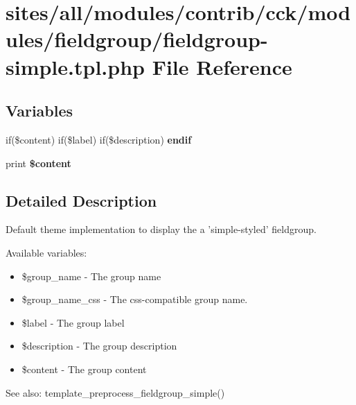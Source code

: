 \hypertarget{fieldgroup-simple_8tpl_8php}{
\section{sites/all/modules/contrib/cck/modules/fieldgroup/fieldgroup-simple.tpl.php File Reference}
\label{fieldgroup-simple_8tpl_8php}
}
\subsection*{Variables}
\begin{CompactItemize}
\item 
\hypertarget{fieldgroup-simple_8tpl_8php_82cd33ca97ff99f2fcc5e9c81d65251b}{
if(\$content) if(\$label) if(\$description) \textbf{endif}}
\label{fieldgroup-simple_8tpl_8php_82cd33ca97ff99f2fcc5e9c81d65251b}

\item 
\hypertarget{fieldgroup-simple_8tpl_8php_b7b7210f43aa78e34f0b202de894a74c}{
print \textbf{\$content}}
\label{fieldgroup-simple_8tpl_8php_b7b7210f43aa78e34f0b202de894a74c}

\end{CompactItemize}


\subsection{Detailed Description}
Default theme implementation to display the a 'simple-styled' fieldgroup.

Available variables:\begin{itemize}
\item \$group\_\-name - The group name\item \$group\_\-name\_\-css - The css-compatible group name.\item \$label - The group label\item \$description - The group description\item \$content - The group content\end{itemize}


\begin{Desc}
\item[See also:]template\_\-preprocess\_\-fieldgroup\_\-simple() \end{Desc}
